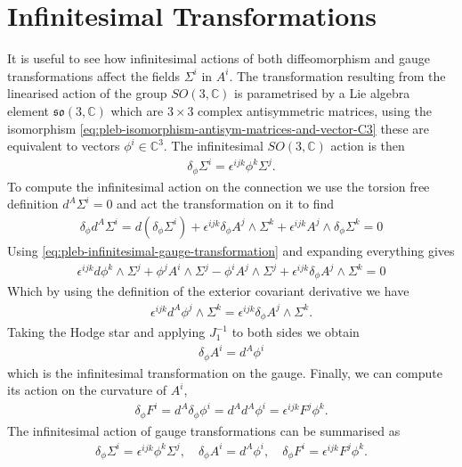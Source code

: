 \documentclass[10pt]{report}
\theoremstyle{definition}
\newcommand{\C}[0]{\mathbb{C}}
\newcommand{\E}[0]{\C^3}
\begin{document}
\section{Infinitesimal Transformations}
It is useful to see how infinitesimal actions of both diffeomorphism and gauge transformations affect the fields $\Sigma^i$ in $A^i$. The transformation resulting from the linearised action of the group $SO(3,\C)$ is parametrised by a Lie algebra element $\mathfrak{so}(3,\C)$ which are $3\times 3$ complex antisymmetric matrices, using the isomorphism \cref{eq:pleb-isomorphism-antisym-matrices-and-vector-C3} these are equivalent to vectors $\phi^i \in \E$. The infinitesimal $SO(3,\C)$ action is then
\begin{align}
    \delta_\phi \Sigma^i = \epsilon^{ijk} \phi^k \Sigma^j. \label{eq:pleb-infinitesimal-gauge-transformation}
\end{align}
To compute the infinitesimal action on the connection we use the torsion free definition $d^A \Sigma^i = 0$ and act the transformation on it to find 
\begin{align}
    \delta_\phi d^A \Sigma^i = d (\delta_\phi \Sigma^i) + \epsilon^{ijk} \delta_\phi A^j \wedge \Sigma^k + \epsilon^{ijk} A^j \wedge \delta_\phi \Sigma^k = 0
\end{align}
Using \cref{eq:pleb-infinitesimal-gauge-transformation} and expanding everything gives 
\begin{align}
    \epsilon^{ijk} d\phi^k \wedge \Sigma^j + \phi^j A^i \wedge \Sigma^j - \phi^i A^j \wedge \Sigma^j + \epsilon^{ijk} \delta_\phi A^j \wedge \Sigma^k = 0
\end{align}
Which by using the definition of the exterior covariant derivative we have 
\begin{align}
    \epsilon^{ijk} d^A \phi^j \wedge \Sigma^k = \epsilon^{ijk} \delta_\phi A^j \wedge \Sigma^k.
\end{align}
Taking the Hodge star and applying $J_1^{-1}$ to both sides we obtain 
\begin{align}
    \delta_\phi A^i = d^A \phi^i
\end{align}
which is the infinitesimal transformation on the gauge. Finally, we can compute its action on the curvature of $A^i$, 
\begin{align}
    \delta_\phi F^i = d^A \delta_\phi \phi^i = d^A d^A \phi^i = \epsilon^{ijk} F^j \phi^k.
\end{align}
The infinitesimal action of gauge transformations can be summarised as 
\begin{align}
    \delta_\phi \Sigma^i = \epsilon^{ijk} \phi^k \Sigma^j, \quad \delta_\phi A^i = d^A \phi^i, \quad \delta_\phi F^i = \epsilon^{ijk} F^j \phi^k.
\end{align}
\end{document}
